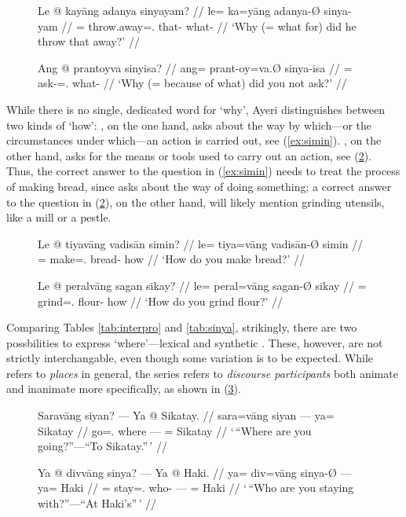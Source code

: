 \begin{figure}[h]
\pex\label{ex:sinyacase}
\a\begingl
	\gla Le @ kayāng adanya sinyayam? //
	\glb le= ka=yāng adanya-Ø sinya-yam //
	\glc \PatTI{}= throw.away=\TsgM{}.\Aarg{} that-\Top{} what-\Dat{} //
	\glft `Why (= what for) did he throw that away?' //
\endgl

\a\begingl
	\gla Ang @ prantoyva sinyisa? //
	\glb ang= prant-oy=va.Ø sinya-isa //
	\glc \AgtT{}= ask-\Neg{}=\Second{}.\Top{} what-\Caus{} //
	\glft `Why (= because of what) did you not ask?' //
\endgl
\xe
\end{figure}

While there is no single, dedicated word for `why', Ayeri distinguishes between
two kinds of `how': , on the one hand, asks about the way
by which---or the circumstances under which---an action is carried out, see
(\ref{ex:simin}). , on the other hand, asks for the means or
tools used to carry out an action, see (\ref{ex:sikay}). Thus, the correct
answer to the question in (\ref{ex:simin}) needs to treat the process of making
bread, since  asks about the way of doing something; a
correct answer to the question in (\ref{ex:sikay}), on the other hand, will
likely mention grinding utensils, like a mill or a pestle.

\begin{figure}[h]
\pex
\a\label{ex:simin}\begingl
	\gla Le @ tiyavāng vadisān simin? //
	\glb le= tiya=vāng vadisān-Ø simin //
	\glc \PatTI{}= make=\Second{}.\Aarg{} bread-\Top{} how //
	\glft `How do you make bread?' //
\endgl

\a\label{ex:sikay}\begingl
	\gla Le @ peralvāng sagan sikay? //
	\glb le= peral=vāng sagan-Ø sikay //
	\glc \PatTI{}= grind=\Second{}.\Aarg{} flour-\Top{} how //
	\glft `How do you grind flour?' //
\endgl
\xe
\end{figure}

Comparing Tables \ref{tab:interpro} and \ref{tab:sinya}, strikingly, there are
two possbilities to express `where'---lexical  and synthetic
. These, however, are not strictly interchangable, even
though some variation is to be expected. While  refers to
\emph{places} in general, the  series refers to
\emph{discourse participants} both animate and inanimate more specifically, as
shown in (\ref{ex:siyansinya}).

\begin{figure}[h]
\pex\label{ex:siyansinya}
\a\begingl
	\gla Saravāng siyan? --- Ya @ Sikatay. //
	\glb sara=vāng siyan --- ya= Sikatay //
	\glc go=\Second{}.\Aarg{} where --- \Loc{}= Sikatay //
	\glft `\,\enquote{Where are you going?}---\enquote{To Sikatay.}\,' //
\endgl

\a\begingl
	\gla Ya @ divvāng sinya? --- Ya @ Haki. //
	\glb ya= div=vāng sinya-Ø --- ya= Haki //
	\glc \LocT{}= stay=\Second{}.\Aarg{} who-\Top{} --- \Loc{}= Haki //
	\glft `\,\enquote{Who are you staying with?}---\enquote{At Haki's}\,' //
\endgl
\xe
\end{figure}

